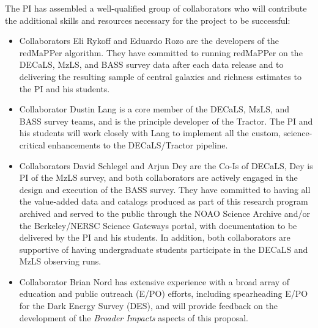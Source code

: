 \documentclass[12pt, preprint]{aastex}
\newcommand{\redmapper}{redMaPPer}
\begin{document}
The PI has assembled a well-qualified group of collaborators who will contribute
the additional skills and resources necessary for the project to be successful:
\vspace*{-2mm}
\begin{itemize}
\item{Collaborators Eli Rykoff and Eduardo Rozo are the developers of the
  \redmapper{} algorithm.  They have committed to running \redmapper{} on the
  DECaLS, MzLS, and BASS survey data after each data release and to delivering
  the resulting sample of central galaxies and richness estimates to the PI and
  his students.}
\item{Collaborator Dustin Lang is a core member of the DECaLS, MzLS, and BASS
  survey teams, and is the principle developer of the Tractor.  The PI and his
  students will work closely with Lang to implement all the custom,
  science-critical enhancements to the DECaLS/Tractor pipeline.}
\item{Collaborators David Schlegel and Arjun Dey are the Co-Is of DECaLS, Dey is
  PI of the MzLS survey, and both collaborators are actively engaged in the
  design and execution of the BASS survey.  They have committed to having all
  the value-added data and catalogs produced as part of this research program
  archived and served to the public through the NOAO Science Archive and/or the
  Berkeley/NERSC Science Gateways portal, with documentation to be delivered by
  the PI and his students.  In addition, both collaborators are supportive of
  having undergraduate students participate in the DECaLS and MzLS observing
  runs.}
\item{Collaborator Brian Nord has extensive experience with a broad array of
  education and public outreach (E/PO) efforts, including spearheading E/PO for
  the Dark Energy Survey (DES), and will provide feedback on the development of
  the {\em Broader Impacts} aspects of this proposal.}
\end{itemize}
\end{document}
